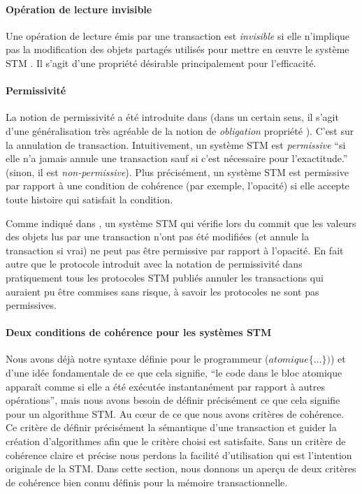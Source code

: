 \paragraph{Opération de lecture invisible}
Une opération de lecture émis par une transaction est {\it invisible}
si elle n'implique pas la modification des objets partagés utilisés pour mettre en œuvre le système STM \cite{MSHAESS06}.
Il s'agit d'une propriété désirable principalement pour l'efficacité.


\paragraph{Permissivité}
La notion de permissivité a été introduite dans \cite{GHS08} (dans un certain sens,
il s'agit d'une généralisation très agréable de la notion de {\it obligation} propriété \cite{IR09-a}). C'est sur la annulation de transaction.
Intuitivement, un système STM est {\it permissive} ``si elle n'a jamais annule une transaction sauf si c'est nécessaire pour l'exactitude.''
(sinon, il est {\it non-permissive}). Plus précisément, un système STM est permissive par rapport à une condition de cohérence
(par exemple, l'opacité) si elle accepte toute histoire qui satisfait la condition.

Comme indiqué dans \cite{GHS08}, un système STM qui vérifie lors du commit que les
valeurs des objets lus par une transaction n'ont pas été modifiées (et annule la transaction si vrai) ne peut pas être permissive par rapport à l'opacité.
En fait autre que le protocole introduit avec la notation de permissivité dans \cite{GHS08} pratiquement
tous les protocoles STM publiés annuler les transactions qui auraient pu être commises sans risque, à savoir les protocoles ne sont pas permissives.


\paragraph{Deux conditions de cohérence pour les systèmes STM}
Nous avons déjà notre syntaxe définie pour le programmeur ($atomique \{ \dots \})$) et d'une idée fondamentale de ce que cela signifie,
``le code dans le bloc atomique apparaît comme si elle a été exécutée instantanément par rapport à autres opérations'',
mais nous avons besoin de définir précisément ce que cela signifie pour un algorithme STM.
Au cœur de ce que nous avons critères de cohérence.
Ce critère de définir précisément la sémantique d'une transaction et guider la création d'algorithmes afin que le critère choisi est satisfaite.
Sans un critère de cohérence claire et précise nous perdons la facilité d'utilisation qui est l'intention originale de la STM.
Dans cette section, nous donnons un aperçu de deux critères de cohérence bien connu définis pour la mémoire transactionnelle.




